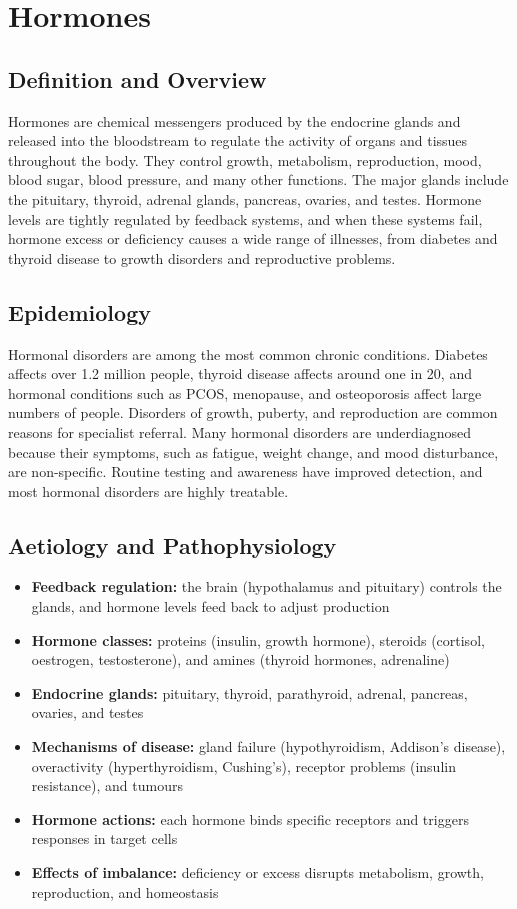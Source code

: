 \chapter{Hormones}

\section*{Definition and Overview}
Hormones are chemical messengers produced by the endocrine glands and released into the bloodstream to regulate the activity of organs and tissues throughout the body. They control growth, metabolism, reproduction, mood, blood sugar, blood pressure, and many other functions. The major glands include the pituitary, thyroid, adrenal glands, pancreas, ovaries, and testes. Hormone levels are tightly regulated by feedback systems, and when these systems fail, hormone excess or deficiency causes a wide range of illnesses, from diabetes and thyroid disease to growth disorders and reproductive problems.

\section*{Epidemiology}
Hormonal disorders are among the most common chronic conditions. Diabetes affects over 1.2 million people, thyroid disease affects around one in 20, and hormonal conditions such as PCOS, menopause, and osteoporosis affect large numbers of people. Disorders of growth, puberty, and reproduction are common reasons for specialist referral. Many hormonal disorders are underdiagnosed because their symptoms, such as fatigue, weight change, and mood disturbance, are non-specific. Routine testing and awareness have improved detection, and most hormonal disorders are highly treatable.

\section*{Aetiology and Pathophysiology}
\begin{itemize}
    \item \textbf{Feedback regulation:} the brain (hypothalamus and pituitary) controls the glands, and hormone levels feed back to adjust production
    \item \textbf{Hormone classes:} proteins (insulin, growth hormone), steroids (cortisol, oestrogen, testosterone), and amines (thyroid hormones, adrenaline)
    \item \textbf{Endocrine glands:} pituitary, thyroid, parathyroid, adrenal, pancreas, ovaries, and testes
    \item \textbf{Mechanisms of disease:} gland failure (hypothyroidism, Addison's disease), overactivity (hyperthyroidism, Cushing's), receptor problems (insulin resistance), and tumours
    \item \textbf{Hormone actions:} each hormone binds specific receptors and triggers responses in target cells
    \item \textbf{Effects of imbalance:} deficiency or excess disrupts metabolism, growth, reproduction, and homeostasis
\end{itemize}

